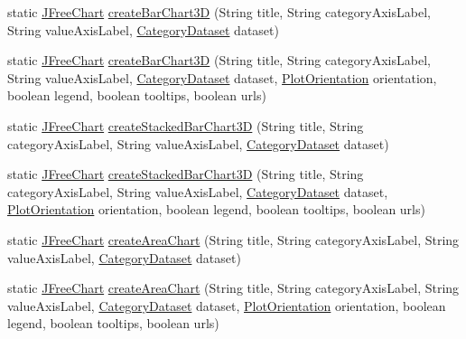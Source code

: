 \begin{DoxyCompactItemize}
\item 
static \mbox{\hyperlink{classorg_1_1jfree_1_1chart_1_1_j_free_chart}{J\+Free\+Chart}} \mbox{\hyperlink{classorg_1_1jfree_1_1chart_1_1_chart_factory_a528f95660b1319f75542624812a910de}{create\+Bar\+Chart3D}} (String title, String category\+Axis\+Label, String value\+Axis\+Label, \mbox{\hyperlink{interfaceorg_1_1jfree_1_1data_1_1category_1_1_category_dataset}{Category\+Dataset}} dataset)
\item 
static \mbox{\hyperlink{classorg_1_1jfree_1_1chart_1_1_j_free_chart}{J\+Free\+Chart}} \mbox{\hyperlink{classorg_1_1jfree_1_1chart_1_1_chart_factory_ae5e3dae7c9f16353d5be359e87377caf}{create\+Bar\+Chart3D}} (String title, String category\+Axis\+Label, String value\+Axis\+Label, \mbox{\hyperlink{interfaceorg_1_1jfree_1_1data_1_1category_1_1_category_dataset}{Category\+Dataset}} dataset, \mbox{\hyperlink{classorg_1_1jfree_1_1chart_1_1plot_1_1_plot_orientation}{Plot\+Orientation}} orientation, boolean legend, boolean tooltips, boolean urls)
\item 
static \mbox{\hyperlink{classorg_1_1jfree_1_1chart_1_1_j_free_chart}{J\+Free\+Chart}} \mbox{\hyperlink{classorg_1_1jfree_1_1chart_1_1_chart_factory_a3600b4a11cfb7d7b5e7d8b11ba4cef52}{create\+Stacked\+Bar\+Chart3D}} (String title, String category\+Axis\+Label, String value\+Axis\+Label, \mbox{\hyperlink{interfaceorg_1_1jfree_1_1data_1_1category_1_1_category_dataset}{Category\+Dataset}} dataset)
\item 
static \mbox{\hyperlink{classorg_1_1jfree_1_1chart_1_1_j_free_chart}{J\+Free\+Chart}} \mbox{\hyperlink{classorg_1_1jfree_1_1chart_1_1_chart_factory_a4c54d4b21f8eabe8325f4400905bf704}{create\+Stacked\+Bar\+Chart3D}} (String title, String category\+Axis\+Label, String value\+Axis\+Label, \mbox{\hyperlink{interfaceorg_1_1jfree_1_1data_1_1category_1_1_category_dataset}{Category\+Dataset}} dataset, \mbox{\hyperlink{classorg_1_1jfree_1_1chart_1_1plot_1_1_plot_orientation}{Plot\+Orientation}} orientation, boolean legend, boolean tooltips, boolean urls)
\item 
static \mbox{\hyperlink{classorg_1_1jfree_1_1chart_1_1_j_free_chart}{J\+Free\+Chart}} \mbox{\hyperlink{classorg_1_1jfree_1_1chart_1_1_chart_factory_a80b7f6fcbe8a9a2b2f84da2a692e2e9f}{create\+Area\+Chart}} (String title, String category\+Axis\+Label, String value\+Axis\+Label, \mbox{\hyperlink{interfaceorg_1_1jfree_1_1data_1_1category_1_1_category_dataset}{Category\+Dataset}} dataset)
\item 
static \mbox{\hyperlink{classorg_1_1jfree_1_1chart_1_1_j_free_chart}{J\+Free\+Chart}} \mbox{\hyperlink{classorg_1_1jfree_1_1chart_1_1_chart_factory_a574e5844197abbfe21065ccb6b6162a4}{create\+Area\+Chart}} (String title, String category\+Axis\+Label, String value\+Axis\+Label, \mbox{\hyperlink{interfaceorg_1_1jfree_1_1data_1_1category_1_1_category_dataset}{Category\+Dataset}} dataset, \mbox{\hyperlink{classorg_1_1jfree_1_1chart_1_1plot_1_1_plot_orientation}{Plot\+Orientation}} orientation, boolean legend, boolean tooltips, boolean urls)

\end{DoxyCompactItemize}
